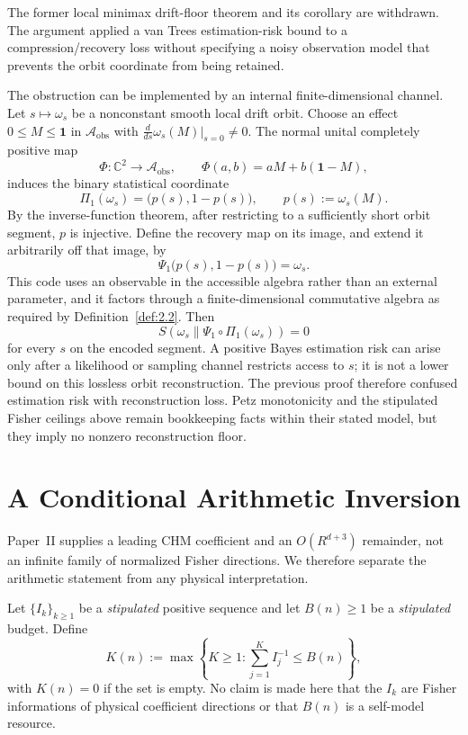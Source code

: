 \documentclass[12pt]{article}
\theoremstyle{definition}
\theoremstyle{remark}
\begin{document}
The former local minimax drift-floor theorem and its corollary are
withdrawn. The argument applied a van Trees estimation-risk bound to a
compression/recovery loss without specifying a noisy observation model
that prevents the orbit coordinate from being retained.

The obstruction can be implemented by an internal finite-dimensional
channel. Let \(s\mapsto\omega_s\) be a nonconstant smooth local drift
orbit. Choose an effect \(0\le M\le\mathbf{1}\) in
\(\mathcal{A}_{\mathrm{obs}}\) with
\(\frac{d}{ds}\omega_s(M)|_{s=0}\ne0\). The normal unital completely
positive map
\[
\Phi:\mathbb{C}^2\longrightarrow\mathcal{A}_{\mathrm{obs}},
\qquad
\Phi(a,b)=aM+b(\mathbf{1}-M),
\]
induces the binary statistical coordinate
\[
\Pi_1(\omega_s)=\bigl(p(s),1-p(s)\bigr),
\qquad p(s):=\omega_s(M).
\]
By the inverse-function theorem, after restricting to a sufficiently
short orbit segment, \(p\) is injective. Define the recovery map on its
image, and extend it arbitrarily off that image, by
\[
\Psi_1\bigl(p(s),1-p(s)\bigr)=\omega_s.
\]
This code uses an observable in the accessible algebra rather than an
external parameter, and it factors through a finite-dimensional
commutative algebra as required by Definition~\ref{def:2.2}. Then
\[
S\!\left(\omega_s\middle\|\Psi_1\circ\Pi_1(\omega_s)\right)=0
\]
for every \(s\) on the encoded segment. A positive Bayes estimation
risk can arise only after a likelihood or sampling channel restricts
access to \(s\); it is not a lower bound on this lossless orbit
reconstruction. The previous proof therefore confused estimation risk
with reconstruction loss. Petz monotonicity and the stipulated Fisher
ceilings above remain bookkeeping facts within their stated model, but
they imply no nonzero reconstruction floor.

\section{A Conditional Arithmetic Inversion}\label{sec:4}

Paper~II\cite{PaperII} supplies a leading CHM coefficient and an
\(O(R^{d+3})\) remainder, not an infinite family of normalized Fisher
directions. We therefore separate the arithmetic statement from any
physical interpretation.

Let \(\{I_k\}_{k\ge1}\) be a \emph{stipulated} positive sequence and
let \(B(n)\ge1\) be a \emph{stipulated} budget. Define
\[
K(n):=\max\left\{K\ge1:
\sum_{j=1}^{K}I_j^{-1}\le B(n)\right\},
\]
with \(K(n)=0\) if the set is empty. No claim is made here that the
\(I_k\) are Fisher informations of physical coefficient directions or
that \(B(n)\) is a self-model resource.
\end{document}
